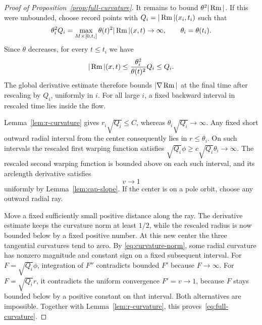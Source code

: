 \begin{proof}[Proof of Proposition~\ref{prop:full-curvature}]
It remains to bound \(\theta^2|\operatorname{Rm}|\). If this were unbounded, choose
record points with \(Q_i=|\operatorname{Rm}|(x_i,t_i)\) such that
\[
\theta_i^2Q_i=\max_{M\times[0,t_i]}\theta(t)^2|\operatorname{Rm}|(x,t)\to\infty,
\qquad \theta_i=\theta(t_i).
\]
Since \(\theta\) decreases, for every \(t\le t_i\) we have
\[
|\operatorname{Rm}|(x,t)\le\frac{\theta_i^2}{\theta(t)^2}Q_i\le Q_i.
\]
The global derivative estimate therefore bounds \(|\nabla\operatorname{Rm}|\) at
the final time after rescaling by \(Q_i\), uniformly in \(i\).
For all large \(i\), a fixed backward interval in rescaled time lies
inside the flow.

Lemma~\ref{lem:r-curvature} gives \(r_i\sqrt{Q_i}\le C\), whereas
\(\theta_i\sqrt{Q_i}\to\infty\). Any fixed short outward radial
interval from the center consequently lies in \(r\le\theta_i\).
On such intervals the rescaled first warping function satisfies
\(\sqrt{Q_i}\phi\ge c\sqrt{Q_i}\theta_i\to\infty\).
The rescaled second warping function is bounded above on each such
interval, and its arclength derivative satisfies
\[
v\longrightarrow1
\]
uniformly by Lemma~\ref{lem:cap-slope}.
If the center is on a pole orbit, choose any outward radial ray.

Move a fixed sufficiently small positive distance along the ray. The
derivative estimate keeps the curvature norm at least \(1/2\), while
the rescaled radius is now bounded below by a fixed positive number.
At this new center the three tangential curvatures tend to zero. By
\eqref{eq:curvature-norm}, some radial curvature has nonzero magnitude
and constant sign on a fixed subsequent interval. For
\(F=\sqrt{Q_i}\phi\), integration of \(F''\) contradicts bounded
\(F'\) because \(F\to\infty\). For \(F=\sqrt{Q_i}r\), it contradicts
the uniform convergence \(F'=v\to1\), because \(F\) stays bounded below
by a positive constant on that interval. Both alternatives are impossible.
Together with Lemma~\ref{lem:r-curvature}, this proves~\eqref{eq:full-curvature}.
\end{proof}

